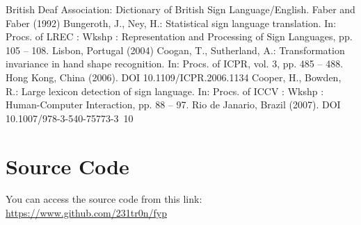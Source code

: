 \documentclass[12pt,a4paper]{report}
\begin{document}
\begin{thebibliography}{00}
	 British Deaf Association: Dictionary of British Sign Language/English. Faber and Faber (1992)
	 Bungeroth, J., Ney, H.: Statistical sign language translation. In: Procs. of LREC : Wkshp : Representation and Processing of Sign Languages, pp. 105 – 108. Lisbon, Portugal (2004)
	 Coogan, T., Sutherland, A.: Transformation invariance in hand shape recognition. In: Procs. of ICPR, vol. 3, pp. 485 – 488. Hong Kong, China (2006). DOI 10.1109/ICPR.2006.1134
	 Cooper, H., Bowden, R.: Large lexicon detection of sign language. In: Procs. of ICCV : Wkshp : Human-Computer Interaction, pp. 88 – 97. Rio de Janario, Brazil (2007). DOI 10.1007/978-3-540-75773-3\ 10
\end{thebibliography}

\appendix
\chapter{Source Code}
You can access the source code from this link: \url{https://www.github.com/231tr0n/fyp}
\end{document}
